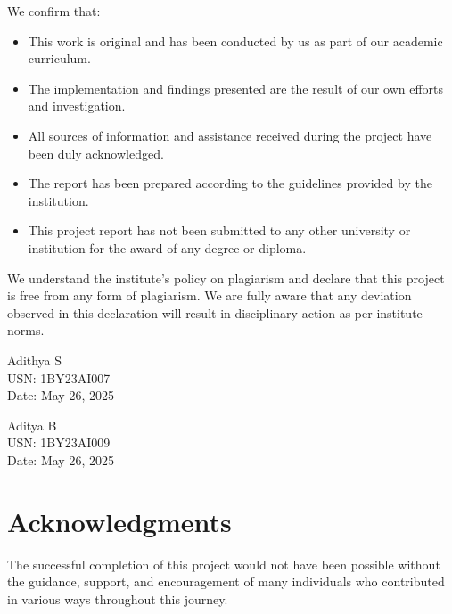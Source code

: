 \documentclass[12pt,a4paper]{report}
\begin{document}
\vspace{0.5cm}

We confirm that:
\begin{itemize}
    \item This work is original and has been conducted by us as part of our academic curriculum.
    \item The implementation and findings presented are the result of our own efforts and investigation.
    \item All sources of information and assistance received during the project have been duly acknowledged.
    \item The report has been prepared according to the guidelines provided by the institution.
    \item This project report has not been submitted to any other university or institution for the award of any degree or diploma.
\end{itemize}

\vspace{0.5cm}

We understand the institute's policy on plagiarism and declare that this project is free from any form of plagiarism. We are fully aware that any deviation observed in this declaration will result in disciplinary action as per institute norms.

\vfill
\begin{minipage}{0.4\textwidth}
\raggedright
Adithya S\\
USN: 1BY23AI007\\
Date: May 26, 2025
\end{minipage}
\hfill
\begin{minipage}{0.4\textwidth}
\raggedleft
Aditya B\\
USN: 1BY23AI009\\
Date: May 26, 2025
\end{minipage}

\cleardoublepage

\chapter*{Acknowledgments}
\thispagestyle{empty}
The successful completion of this project would not have been possible without the guidance, support, and encouragement of many individuals who contributed in various ways throughout this journey.

\vspace{0.5cm}
\end{document}
